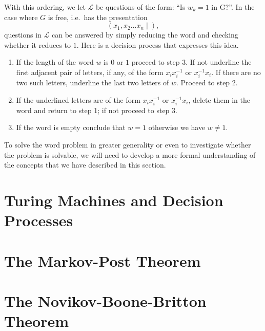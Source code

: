 \documentclass[12pt]{article}
\theoremstyle{definition}
\numberwithin{equation}{theorem}
\begin{document}
With this ordering, we let $\mathcal{L}$ be questions of the form: ``Is $w_k = 1$ in G?''. In the case where $G$ is free, i.e.\ has the presentation
\begin{equation*}
  (x_1,x_2 \dots x_n \mid ),
\end{equation*}
questions in $\mathcal{L}$ can be answered by simply reducing the word and checking whether it reduces to $1$. Here is a decision process that expresses this idea.

\begin{enumerate}
\item If the length of the word $w$ is $0$ or $1$ proceed to step 3. If not underline the first adjacent pair of letters, if any, of the form $x_ix_i^{-1}$ or $x_i^{-1}x_i$. If there are no two such letters, underline the last two letters of $w$. Proceed to step 2.
\item If the underlined letters are of the form $x_ix_i^{-1}$ or $x_i^{-1}x_i$, delete them in the word and return to step 1; if not proceed to step 3.
\item If the word is empty conclude that $w = 1$ otherwise we have $w \neq 1$.
\end{enumerate}

To solve the word problem in greater generality or even to investigate  whether the problem is solvable, we will need to develop a more formal understanding of the concepts that we have described in this section.

\section{Turing Machines and Decision Processes}
\section{The Markov-Post Theorem}
\section{The Novikov-Boone-Britton Theorem}
\nocite{rotman1999introduction}



\end{document}
